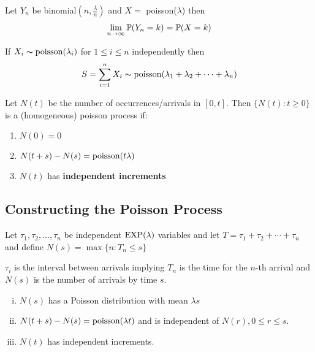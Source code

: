 \documentclass[12pt,a4paper]{article}
\begin{document}
\begin{thm}
    Let $Y_n$ be binomial$(n, \frac{\lambda}{n})$ and $X = $ poisson($\lambda$) then 
    \begin{align*}
        \lim\limits_{n \rightarrow \infty}\mathbb{P}(Y_n = k) = \mathbb{P}(X = k)
    \end{align*}
\end{thm}
\begin{thm}
    If $X_i \thicksim \mathrm{poisson}(\lambda_i)$ for $1\leq i \leq n$ independently then 
    \begin{align*}
        S = \sum\limits_{i=1}^{n}X_i \thicksim \mathrm{poisson}(\lambda_1 + \lambda_2 + \cdots + \lambda_n)
    \end{align*}
\end{thm}

\begin{defn}
    Let $N(t)$ be the number of occurrences/arrivals in $[0,t]$. Then $\{N(t) : t\geq 0\}$ is a (homogeneous) poisson process if:
    \begin{enumerate}[(1)]
        \item $N(0) = 0$
        \item $N(t+s) - N(s) = \mathrm{poisson}(t\lambda)$
        \item $N(t)$ has \textbf{independent increments}
    \end{enumerate}
\end{defn}
\newpage
\subsection{Constructing the Poisson Process}
\begin{defn}[]
    Let $\tau_1, \tau_2, \ldots, \tau_n$ be independent $\mathrm{EXP}(\lambda)$ variables and let 
    $T = \tau_1 + \tau_2 + \cdots + \tau_n$ and define $N(s) = \max\{n : T_n \leq s\}$
\end{defn}
$\tau_i$ is the interval between arrivals implying $T_n$ is the time for the $n$-th arrival and $N(s)$ is the number of arrivals by time $s$. 

\begin{enumerate}[(i)]
    \item $N(s)$ has a Poisson distribution with mean $\lambda s$
    \item $N(t+s) - N(s) = \mathrm{poisson}(\lambda t)$ and is independent of $N(r), 0 \leq r\leq s$. 
    \item $N(t)$ has independent increments.  
\end{enumerate}
\newpage
\end{document}
